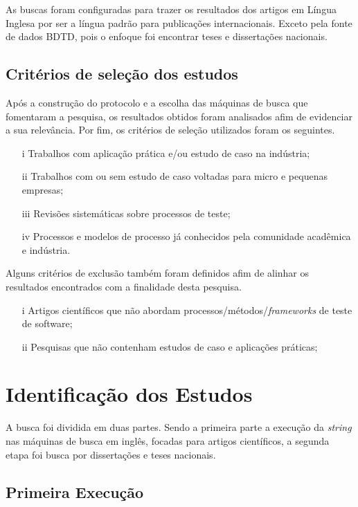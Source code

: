 As buscas foram configuradas para trazer os resultados dos artigos em Língua Inglesa por ser a língua padrão para publicações internacionais. Exceto pela fonte de dados BDTD, pois o enfoque foi encontrar teses e dissertações nacionais.

\subsection{Critérios de seleção dos estudos}
\label{sec:criteriosdeselecao}

Após a construção do protocolo e a escolha das máquinas de busca que fomentaram a pesquisa, os resultados obtidos foram analisados afim de evidenciar a sua relevância. Por fim, os critérios de seleção utilizados foram os seguintes.

\begin{enumerate}
\item [i] Trabalhos com aplicação prática e/ou estudo de caso na indústria;
\item [ii] Trabalhos com ou sem estudo de caso voltadas para micro e pequenas empresas;
\item [iii] Revisões sistemáticas sobre processos de teste;
\item [iv] Processos e modelos de processo já conhecidos pela comunidade acadêmica e indústria.
\end{enumerate} 

Alguns critérios de exclusão também foram definidos afim de alinhar os resultados encontrados com a finalidade desta pesquisa.

\begin{enumerate} 
    \item [i] Artigos científicos que não abordam processos/métodos/\textit{frameworks} de teste de software;
    \item [ii] Pesquisas que não contenham estudos de caso e aplicações práticas;
\end{enumerate}

\section{Identificação dos Estudos}
\label{sec:identificacaodosestudos}

A busca foi dividida em duas partes. Sendo a primeira parte a execução da \textit{string} nas máquinas de busca  em inglês, focadas para artigos científicos, a segunda etapa foi busca por dissertações e teses nacionais.

\subsection{Primeira Execução}
\label{sec:primeiraexecucao}

